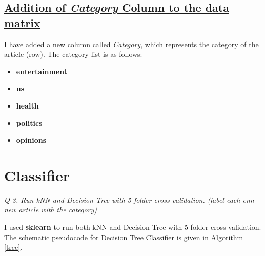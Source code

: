 \documentclass[journal,onecolumn]{IEEEtran}
\begin{document}
\subsection{\underline{Addition of \textit{Category} Column to the data matrix}}

I have added a new column called \textit{Category}, which represents the category of the article (row). The category list is as follows:
\begin{itemize}
\item \textbf{entertainment}
\item \textbf{us}
\item \textbf{health}
\item \textbf{politics}
\item \textbf{opinions}
\end{itemize}

\section{Classifier}
\textit{Q 3. Run kNN and Decision Tree with 5-folder cross validation. (label each cnn new article with the
category)}

I used \textbf{sklearn} to run both kNN and Decision Tree with 5-folder cross validation.
The schematic pseudocode for Decision Tree Classifier is given in Algorithm \ref{tree}.
\end{document}
